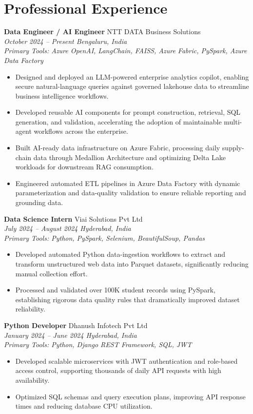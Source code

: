\documentclass[a4paper,10pt]{article}
\begin{document}
\section*{Professional Experience}

\textbf{Data Engineer / AI Engineer} \hfill NTT DATA Business Solutions \\
\textit{October 2024 -- Present \hfill Bengaluru, India} \\
\textit{Primary Tools: Azure OpenAI, LangChain, FAISS, Azure Fabric, PySpark, Azure Data Factory}
\begin{itemize}
    \item Designed and deployed an LLM-powered enterprise analytics copilot, enabling secure natural-language queries against governed lakehouse data to streamline business intelligence workflows.
    \item Developed reusable AI components for prompt construction, retrieval, SQL generation, and validation, accelerating the adoption of maintainable multi-agent workflows across the enterprise.
    \item Built AI-ready data infrastructure on Azure Fabric, processing daily supply-chain data through Medallion Architecture and optimizing Delta Lake workloads for downstream RAG consumption.
    \item Engineered automated ETL pipelines in Azure Data Factory with dynamic parameterization and data-quality validation to ensure reliable reporting and grounding data.
\end{itemize}

\textbf{Data Science Intern} \hfill Viai Solutions Pvt Ltd \\
\textit{July 2024 -- August 2024 \hfill Hyderabad, India} \\
\textit{Primary Tools: Python, PySpark, Selenium, BeautifulSoup, Pandas}
\begin{itemize}
    \item Developed automated Python data-ingestion workflows to extract and transform unstructured web data into Parquet datasets, significantly reducing manual collection effort.
    \item Processed and validated over 100K student records using PySpark, establishing rigorous data quality rules that dramatically improved dataset reliability.
\end{itemize}

\textbf{Python Developer} \hfill Dhanush Infotech Pvt Ltd \\
\textit{January 2024 -- June 2024 \hfill Hyderabad, India} \\
\textit{Primary Tools: Python, Django REST Framework, SQL, JWT}
\begin{itemize}
    \item Developed scalable microservices with JWT authentication and role-based access control, supporting thousands of daily API requests with high availability.
    \item Optimized SQL schemas and query execution plans, improving API response times and reducing database CPU utilization.
\end{itemize}
\end{document}
